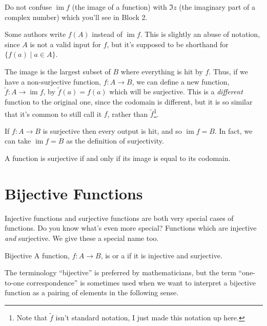 \documentclass[fleqn]{LectureClass/LectureClass}
\DeclareMathOperator{\im}{im}
\begin{document}
    \begin{wrn}
        Do not confuse \(\im f\) (the image of a function) with \(\Im z\) (the imaginary part of a complex number) which you'll see in Block 2.
    \end{wrn}
    
    Some authors write \(f(A)\) instead of \(\im f\).
    This is slightly an abuse of notation, since \(A\) is not a valid input for \(f\), but it's supposed to be shorthand for \(\{f(a) \mid a \in A\}\).
    
    The image is the largest subset of \(B\) where everything is hit by \(f\).
    Thus, if we have a non-surjective function, \(f \colon A \to B\), we can define a new function, \(\tilde{f} \colon A \to \im f\), by \(\tilde{f}(a) = f(a)\) which will be surjective.
    This is a \emph{different} function to the original one, since the codomain is different, but it is so similar that it's common to still call it \(f\), rather than \(\tilde{f}\)\footnote{Note that \(\tilde{f}\) isn't standard notation, I just made this notation up here.}.
    
    If \(f \colon A \to B\) is surjective then every output is hit, and so \(\im f = B\).
    In fact, we can take \(\im f = B\) as the definition of surjectivity.
    
    \begin{thm}{}{}
        A function is surjective if and only if its image is equal to its codomain.
    \end{thm}
    
    \section{Bijective Functions}
    Injective functions and surjective functions are both very special cases of functions.
    Do you know what's even more special?
    Functions which are injective \emph{and} surjective.
    We give these a special name too.
    
    \begin{dfn}{Bijective}{}
        A function, \(f \colon A \to B\), is  or a  if it is injective and surjective.
    \end{dfn}
    
    The terminology \enquote{bijective} is preferred by mathematicians, but the term \enquote{one-to-one correspondence} is sometimes used when we want to interpret a bijective function as a pairing of elements in the following sense.
    
\end{document}
